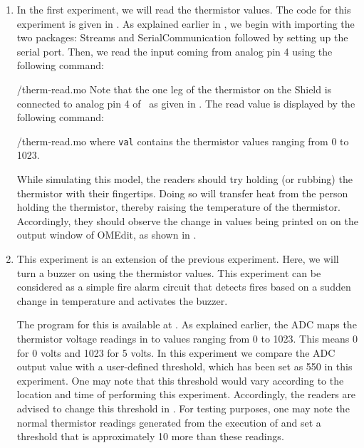 \begin{enumerate}
  \item In the first experiment, we will read the thermistor values. The code for this experiment is given in
        . As explained earlier in ,
        we begin with importing the two packages: Streams and SerialCommunication followed
        by setting up the serial port. Then, we read the input coming from analog pin 4 using the
        following command:
        
        {\LocTHERMOpenModelicacode/therm-read.mo} Note that the one leg of the thermistor on
        the Shield is connected to analog pin 4 of \arduino\,
        as given in . The read value is displayed
        by the following command:
        
        {\LocTHERMOpenModelicacode/therm-read.mo} where {\tt val} contains
        the thermistor values ranging from 0 to 1023.

        While simulating this model,
        the readers should try holding (or rubbing) the thermistor with their fingertips.
        Doing so will transfer heat from the person holding the
        thermistor, thereby raising the temperature of the thermistor.
        Accordingly, they should observe the change in values being printed on on the output window of OMEdit, as shown in .

  \item This experiment is an extension of the previous experiment. Here,
        we will turn a buzzer on using the thermistor values. This experiment
        can be considered as a simple fire alarm circuit that
        detects fires based on a sudden change in temperature and
        activates the buzzer.

        The program for this is available at
        .  As explained earlier,
        the ADC maps the thermistor voltage readings in to values
        ranging from 0 to 1023. This means 0 for 0 volts and 1023 for 5
        volts. In this experiment we compare the ADC output value with a user-defined
        threshold, which has been set as 550 in this experiment. One may note that
        this threshold would vary according to the location and time of performing
        this experiment. Accordingly, the readers are advised to change this threshold
        in . For testing purposes, one may note the
        normal thermistor readings generated from the execution of 
        and set a threshold that is approximately 10 more than these readings.


\end{enumerate}
